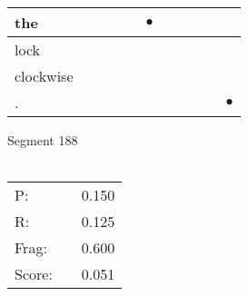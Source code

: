 \documentclass[landscape]{article}
\newcommand{\ssp}{\hspace{2pt}}
\newcommand{\mex}{\cellcolor{g}$\bullet$}
\begin{document}
\begin{tabular}{|l|p{10pt}|p{10pt}|p{10pt}|p{10pt}|p{10pt}|p{10pt}|p{10pt}|p{10pt}|p{10pt}|p{10pt}|}
\hline
\ssp \cellcolor{ref4}the \ssp&\hspace{2pt}&\hspace{2pt}&\hspace{2pt}&\hspace{2pt}&\hspace{2pt}\mex&\hspace{2pt}&\hspace{2pt}&\hspace{2pt}&\hspace{2pt}&\hspace{2pt}\\
\hline
\ssp lock \ssp&\hspace{2pt}&\hspace{2pt}&\hspace{2pt}&\hspace{2pt}&\hspace{2pt}&\hspace{2pt}&\hspace{2pt}&\hspace{2pt}&\hspace{2pt}&\hspace{2pt}\\
\hline
\ssp clockwise \ssp&\hspace{2pt}&\hspace{2pt}&\hspace{2pt}&\hspace{2pt}&\hspace{2pt}&\hspace{2pt}&\hspace{2pt}&\hspace{2pt}&\hspace{2pt}&\hspace{2pt}\\
\hline
\ssp \cellcolor{ref9}. \ssp&\hspace{2pt}&\hspace{2pt}&\hspace{2pt}&\hspace{2pt}&\hspace{2pt}&\hspace{2pt}&\hspace{2pt}&\hspace{2pt}&\hspace{2pt}&\hspace{2pt}\mex\\
\hline
\end{tabular}

\vspace{6pt}
\noindent Segment 188\\\\
\noindent\begin{tabular}{lm{12pt}r}
\hline
P:&&0.150\\
R:&&0.125\\
Frag:&&0.600\\
Score:&&0.051\\
\end{tabular}
\end{document}
